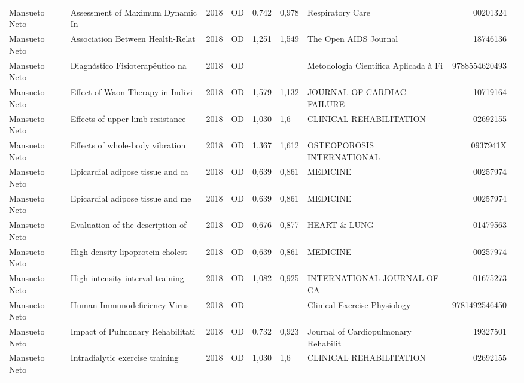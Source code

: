 \documentclass[12pt,brazil]{article}\usepackage[]{graphicx}\usepackage[]{xcolor}
\begin{document}
\begin{longtable}{lllrrllrr}
Mansueto Neto & Assessment of Maximum Dynamic In & 2018 & OD & 0,742 & 0,978 & Respiratory Care & 00201324 \\
Mansueto Neto & Association Between Health-Relat & 2018 & OD & 1,251 & 1,549 & The Open AIDS Journal & 18746136 \\
Mansueto Neto & Diagnóstico Fisioterapêutico na  & 2018 & OD &  &  & Metodologia Científica Aplicada à Fi & 9788554620493 \\
Mansueto Neto & Effect of Waon Therapy in Indivi & 2018 & OD & 1,579 & 1,132 & JOURNAL OF CARDIAC FAILURE & 10719164 \\
Mansueto Neto & Effects of upper limb resistance & 2018 & OD & 1,030 & 1,6 & CLINICAL REHABILITATION & 02692155 \\
Mansueto Neto & Effects of whole-body vibration  & 2018 & OD & 1,367 & 1,612 & OSTEOPOROSIS INTERNATIONAL & 0937941X \\
Mansueto Neto & Epicardial adipose tissue and ca & 2018 & OD & 0,639 & 0,861 & MEDICINE & 00257974 \\
\rowcolor{duplic}\rowcolor{duplic}\rowcolor{duplic}\rowcolor{duplic}\rowcolor{duplic}\rowcolor{duplic}\rowcolor{duplic}\rowcolor{duplic}\rowcolor{duplic}\rowcolor{duplic}\rowcolor{duplic}\rowcolor{duplic}\rowcolor{duplic}\rowcolor{duplic}\rowcolor{duplic}\rowcolor{duplic}Mansueto Neto & Epicardial adipose tissue and me & 2018 & OD & 0,639 & 0,861 & MEDICINE & 00257974 \\
Mansueto Neto & Evaluation of the description of & 2018 & OD & 0,676 & 0,877 & HEART \& LUNG & 01479563 \\
Mansueto Neto & High-density lipoprotein-cholest & 2018 & OD & 0,639 & 0,861 & MEDICINE & 00257974 \\
\rowcolor{duplic}\rowcolor{duplic}\rowcolor{duplic}\rowcolor{duplic}\rowcolor{duplic}\rowcolor{duplic}\rowcolor{duplic}\rowcolor{duplic}\rowcolor{duplic}\rowcolor{duplic}\rowcolor{duplic}\rowcolor{duplic}\rowcolor{duplic}\rowcolor{duplic}\rowcolor{duplic}\rowcolor{duplic}Mansueto Neto & High intensity interval training & 2018 & OD & 1,082 & 0,925 & INTERNATIONAL JOURNAL OF CA & 01675273 \\
Mansueto Neto & Human Immunodeficiency Virus & 2018 & OD &  &  & Clinical Exercise Physiology & 9781492546450 \\
Mansueto Neto & Impact of Pulmonary Rehabilitati & 2018 & OD & 0,732 & 0,923 & Journal of Cardiopulmonary Rehabilit & 19327501 \\
Mansueto Neto & Intradialytic exercise training  & 2018 & OD & 1,030 & 1,6 & CLINICAL REHABILITATION & 02692155 \\

\end{longtable}
\end{document}
